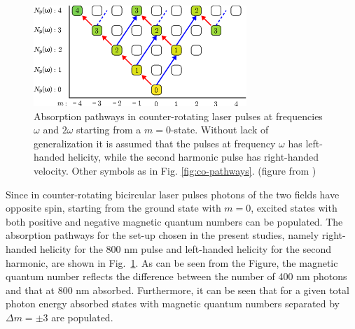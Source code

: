 \begin{figure}[!ht]
 \centering
  \includegraphics[width=0.75\columnwidth]{figs/Rydberg/counter_rotating_absorbtion.png}
 \caption{\label{fig:counter-pathways}
Absorption pathways in counter-rotating laser pulses at frequencies $\omega$ and $2 \omega$ starting from a $m=0$-state. Without lack of generalization it is assumed that the pulses at frequency $\omega$ has left-handed helicity, while the second harmonic pulse has right-handed velocity. Other symbols as in Fig. \ref{fig:co-pathways}. (figure from \cite{venzke2020_ryd})
 }
 \end{figure}

Since in counter-rotating bicircular laser pulses photons of the two fields have opposite spin, starting from the ground state with $m=0$, excited states with both positive and negative magnetic quantum numbers can be populated. The absorption pathways for the set-up chosen in the present studies, namely right-handed helicity for the 800 nm pulse and left-handed helicity for the second harmonic, are shown in Fig.\ \ref{fig:counter-pathways}. As can be seen from the Figure, the magnetic quantum number reflects the difference between the number of 400 nm photons and that at 800 nm absorbed. Furthermore, it can be seen that for a given total photon energy absorbed states with magnetic quantum numbers separated by $\Delta m = \pm 3$ are populated. 

